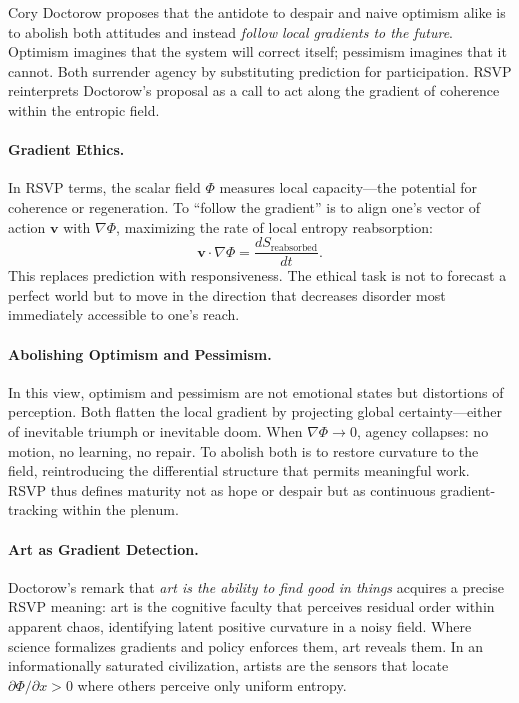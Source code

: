 \documentclass[12pt]{article}
\begin{document}
Cory Doctorow proposes that the antidote to despair and naive optimism alike is to abolish both attitudes and instead \emph{follow local gradients to the future}.
Optimism imagines that the system will correct itself; pessimism imagines that it cannot.
Both surrender agency by substituting prediction for participation.
RSVP reinterprets Doctorow’s proposal as a call to act along the gradient of coherence within the entropic field.

\paragraph{Gradient Ethics.}
In RSVP terms, the scalar field $\Phi$ measures local capacity---the potential for coherence or regeneration.
To ``follow the gradient'' is to align one’s vector of action $\mathbf{v}$ with $\nabla \Phi$, maximizing the rate of local entropy reabsorption:
\[
\mathbf{v} \cdot \nabla \Phi = \frac{dS_{\text{reabsorbed}}}{dt}.
\]
This replaces prediction with responsiveness.
The ethical task is not to forecast a perfect world but to move in the direction that decreases disorder most immediately accessible to one’s reach.

\paragraph{Abolishing Optimism and Pessimism.}
In this view, optimism and pessimism are not emotional states but distortions of perception.
Both flatten the local gradient by projecting global certainty---either of inevitable triumph or inevitable doom.
When $\nabla\Phi \to 0$, agency collapses: no motion, no learning, no repair.
To abolish both is to restore curvature to the field, reintroducing the differential structure that permits meaningful work.
RSVP thus defines maturity not as hope or despair but as continuous gradient-tracking within the plenum.

\paragraph{Art as Gradient Detection.}
Doctorow’s remark that \emph{art is the ability to find good in things} acquires a precise RSVP meaning:
art is the cognitive faculty that perceives residual order within apparent chaos, identifying latent positive curvature in a noisy field.
Where science formalizes gradients and policy enforces them, art reveals them.
In an informationally saturated civilization, artists are the sensors that locate $\partial \Phi/\partial x > 0$ where others perceive only uniform entropy.
\end{document}
